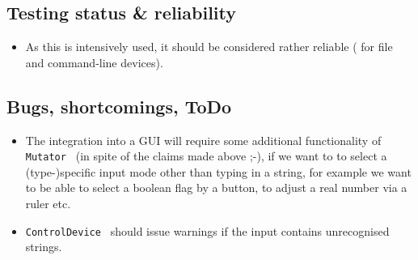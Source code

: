 \documentclass{article}
\begin{document}
\subsection{Testing status \& reliability }

\begin{itemize}
\item  As this is intensively used, it should be considered rather
  reliable ( for file and command-line devices).
\end{itemize}

\subsection{Bugs, shortcomings, ToDo}

\begin{itemize}
 \item  The integration into a GUI will require some additional
   functionality of {\tt  Mutator } (in spite of the claims 
   made above ;-),
   if we want to to select a (type-)specific input mode other 
   than typing in a string,
   for example we want to be able
   to select a boolean flag by a button, 
   to adjust a real number via a ruler etc.
 \item {\tt  ControlDevice } should issue warnings if the input
   contains  unrecognised strings. 
 \end{itemize}
 
\end{document}
